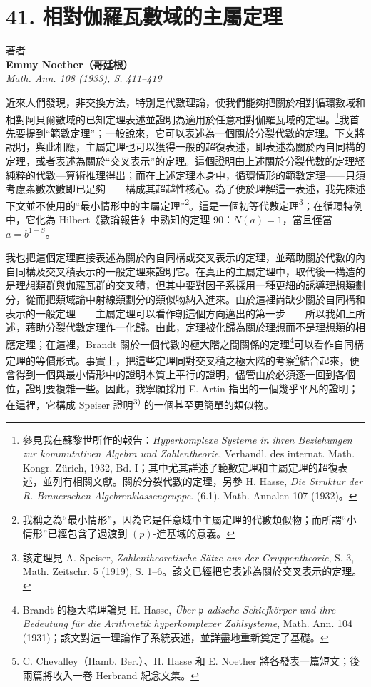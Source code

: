 \documentclass[11pt]{article}
\begin{document}
\section*{41. 相對伽羅瓦數域的主屬定理}

\begin{center}
著者\\[0.4ex]
\textbf{Emmy Noether（哥廷根）}\\[0.8ex]
\emph{Math. Ann. 108 (1933), S. 411--419}
\end{center}

近來人們發現，非交換方法，特別是代數理論，使我們能夠把關於相對循環數域和相對阿貝爾數域的已知定理表述並證明為適用於任意相對伽羅瓦域的定理。\footnote{參見我在蘇黎世所作的報告：\emph{Hyperkomplexe Systeme in ihren Beziehungen zur kommutativen Algebra und Zahlentheorie}, Verhandl. des internat. Math. Kongr. Zürich, 1932, Bd. I；其中尤其詳述了範數定理和主屬定理的超復表述，並列有相關文獻。關於分裂代數的定理，另參 H. Hasse, \emph{Die Struktur der R. Brauerschen Algebrenklassengruppe}. (6.1). Math. Annalen 107 (1932)。}我首先要提到“範數定理”；一般說來，它可以表述為一個關於分裂代數的定理。下文將說明，與此相應，主屬定理也可以獲得一般的超復表述，即表述為關於內自同構的定理，或者表述為關於“交叉表示”的定理。這個證明由上述關於分裂代數的定理經純粹的代數—算術推理得出；而在上述定理本身中，循環情形的範數定理——只須考慮素數次數即已足夠——構成其超越性核心。為了便於理解這一表述，我先陳述下文並不使用的“最小情形中的主屬定理”\footnote{我稱之為“最小情形”，因為它是任意域中主屬定理的代數類似物；而所謂“小情形”已經包含了過渡到 $(p)$-進基域的意義。}。這是一個初等代數定理\footnote{該定理見 A. Speiser, \emph{Zahlentheoretische Sätze aus der Gruppentheorie}, S. 3, Math. Zeitschr. 5 (1919), S. 1--6。該文已經把它表述為關於交叉表示的定理。}；在循環特例中，它化為 Hilbert《數論報告》中熟知的定理 90：$N(a)=1$，當且僅當 $a=b^{1-S}$。

我也把這個定理直接表述為關於內自同構或交叉表示的定理，並藉助關於代數的內自同構及交叉積表示的一般定理來證明它。在真正的主屬定理中，取代後一構造的是理想類群與伽羅瓦群的交叉積，但其中要對因子系採用一種更細的誘導理想類劃分，從而把類域論中射線類劃分的類似物納入進來。由於這裡尚缺少關於自同構和表示的一般定理——主屬定理可以看作朝這個方向邁出的第一步——所以我如上所述，藉助分裂代數定理作一化歸。由此，定理被化歸為關於理想而不是理想類的相應定理；在這裡，Brandt 關於一個代數的極大階之間關係的定理\footnote{Brandt 的極大階理論見 H. Hasse, \emph{Über \(\mathfrak p\)-adische Schiefkörper und ihre Bedeutung für die Arithmetik hyperkomplexer Zahlsysteme}, Math. Ann. 104 (1931)；該文對這一理論作了系統表述，並詳盡地重新奠定了基礎。}可以看作自同構定理的等價形式。事實上，把這些定理同對交叉積之極大階的考察\footnote{C. Chevalley（Hamb. Ber.）、H. Hasse 和 E. Noether 將各發表一篇短文；後兩篇將收入一卷 Herbrand 紀念文集。}結合起來，便會得到一個與最小情形中的證明本質上平行的證明，儘管由於必須逐一回到各個位，證明要複雜一些。因此，我寧願採用 E. Artin 指出的一個幾乎平凡的證明；在這裡，它構成 Speiser 證明\textsuperscript{3)} 的一個甚至更簡單的類似物。
\end{document}
